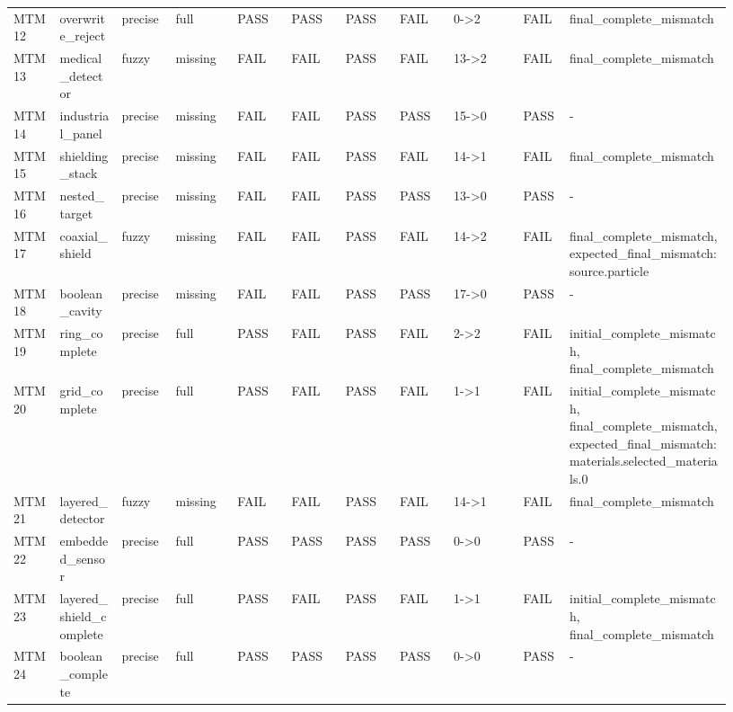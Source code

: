 \documentclass[11pt]{ctexart}
\begin{document}
\begin{longtable}{p{0.06\linewidth}p{0.08\linewidth}p{0.07\linewidth}p{0.08\linewidth}p{0.07\linewidth}p{0.07\linewidth}p{0.07\linewidth}p{0.07\linewidth}p{0.09\linewidth}p{0.06\linewidth}p{0.21\linewidth}}
MTM12 & overwrite\_reject & precise & full & PASS & PASS & PASS & FAIL & 0->2 & FAIL & final\_complete\_mismatch \\
MTM13 & medical\_detector & fuzzy & missing & FAIL & FAIL & PASS & FAIL & 13->2 & FAIL & final\_complete\_mismatch \\
MTM14 & industrial\_panel & precise & missing & FAIL & FAIL & PASS & PASS & 15->0 & PASS & - \\
MTM15 & shielding\_stack & precise & missing & FAIL & FAIL & PASS & FAIL & 14->1 & FAIL & final\_complete\_mismatch \\
MTM16 & nested\_target & precise & missing & FAIL & FAIL & PASS & PASS & 13->0 & PASS & - \\
MTM17 & coaxial\_shield & fuzzy & missing & FAIL & FAIL & PASS & FAIL & 14->2 & FAIL & final\_complete\_mismatch, expected\_final\_mismatch:source.particle \\
MTM18 & boolean\_cavity & precise & missing & FAIL & FAIL & PASS & PASS & 17->0 & PASS & - \\
MTM19 & ring\_complete & precise & full & PASS & FAIL & PASS & FAIL & 2->2 & FAIL & initial\_complete\_mismatch, final\_complete\_mismatch \\
MTM20 & grid\_complete & precise & full & PASS & FAIL & PASS & FAIL & 1->1 & FAIL & initial\_complete\_mismatch, final\_complete\_mismatch, expected\_final\_mismatch:materials.selected\_materials.0 \\
MTM21 & layered\_detector & fuzzy & missing & FAIL & FAIL & PASS & FAIL & 14->1 & FAIL & final\_complete\_mismatch \\
MTM22 & embedded\_sensor & precise & full & PASS & PASS & PASS & PASS & 0->0 & PASS & - \\
MTM23 & layered\_shield\_complete & precise & full & PASS & FAIL & PASS & FAIL & 1->1 & FAIL & initial\_complete\_mismatch, final\_complete\_mismatch \\
MTM24 & boolean\_complete & precise & full & PASS & PASS & PASS & PASS & 0->0 & PASS & - \\
\bottomrule
\end{longtable}
\end{document}
